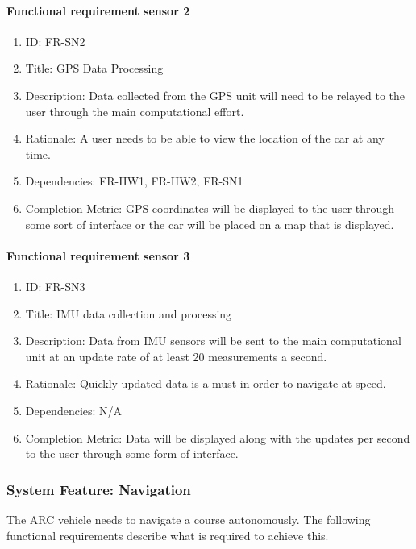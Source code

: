 \documentclass[compsoc,draftclsnofoot,onecolumn,10pt]{IEEEtran}
\begin{document}
	\paragraph{Functional requirement sensor 2}
    		\begin{enumerate}
    			\item ID: FR-SN2
    			\item Title: GPS Data Processing
    			\item Description: Data collected from the GPS unit will need to be relayed to the user through the main computational effort. 
    			\item Rationale: A user needs to be able to view the location of the car at any time. 
    			\item Dependencies: FR-HW1, FR-HW2, FR-SN1
			\item Completion Metric: GPS coordinates will be displayed to the user through some sort of interface or the car will be placed on a map that is displayed. 
    		\end{enumerate}
		
	\paragraph{Functional requirement sensor 3}
    		\begin{enumerate}
    			\item ID: FR-SN3
    			\item Title: IMU data collection and processing
    			\item Description: Data from IMU sensors will be sent to the main computational unit at an update rate of at least 20 measurements a second. 
    			\item Rationale: Quickly updated data is a must in order to navigate at speed.
    			\item Dependencies: N/A
			\item Completion Metric: Data will be displayed along with the updates per second to the user through some form of interface.
    		\end{enumerate}

\subsubsection{System Feature: Navigation}
The ARC vehicle needs to navigate a course autonomously. The following functional
requirements describe what is required to achieve this.\par
\end{document}
